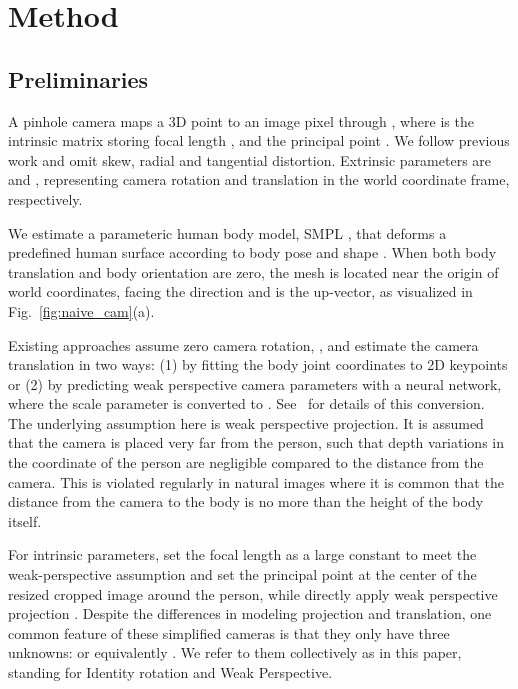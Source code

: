 \documentclass[10pt,twocolumn,letterpaper,usenames,dvipsnames]{article}
\begin{document}
\section{Method}
\label{methods}

\subsection{Preliminaries}
\label{recap}
A pinhole camera maps a 3D point  to an image pixel  through , where  is the intrinsic matrix storing focal length ,  and the principal point . 
We follow  previous work and omit skew, radial and tangential distortion. 
Extrinsic parameters are  and , representing camera rotation and translation in the world coordinate frame, respectively. 

We estimate a parameteric human body model, SMPL \cite{looper_smpl,SMPL-X:2019}, that deforms a predefined human surface  according to body pose  and shape . When both body translation  and body orientation  are zero, the mesh is located near the origin of world coordinates, facing the  direction and  is the up-vector, as visualized in Fig.~\ref{fig:naive_cam}(a).

Existing approaches \cite{bogo_smplify,expose2020eccv,guler_2019_CVPR,jiang2020mpshape,kanazawa_hmr,kocabas2019vibe,SMPL-X:2019,song2020human,CenterHMR} assume zero camera rotation, , and estimate the camera translation  in two ways: 
(1) by fitting the body joint coordinates to 2D keypoints \cite{bogo_smplify,SMPL-X:2019,zanfir2020weakly} or 
(2) by predicting weak perspective camera parameters  with a neural network, where the scale parameter  is converted to  \cite{kanazawa_hmr,kanazawa_temporal_hmr,kocabas2019vibe,SPIN:ICCV:2019}. See \supmat~for details of this conversion.
The underlying assumption here is weak perspective projection. 
It is assumed that the camera is placed very far from the person, such that depth variations in the  coordinate of the person are negligible compared to the distance from the camera. This is violated regularly in natural images where it is common that the distance from the camera to the body is no more than the height of the body itself.

For intrinsic parameters, \cite{bogo_smplify,kocabas2019vibe,SPIN:ICCV:2019,SMPL-X:2019} set the focal length as a large constant  to meet the weak-perspective assumption and set the principal point  at the center of the resized cropped image around the person, while \cite{kanazawa_hmr,CenterHMR,zanfir2020weakly} directly apply weak perspective projection . Despite the differences in modeling projection and translation, one common feature of these simplified cameras is that they only have three unknowns:  or equivalently . 
We refer to them collectively as \emph{\iwcam} in this paper, standing for Identity rotation and Weak Perspective.
\end{document}
